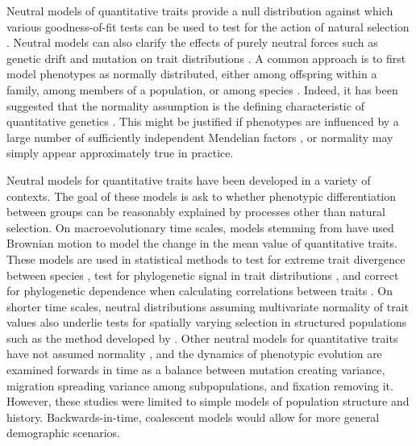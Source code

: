 Neutral models of quantitative traits provide a null distribution against which
various goodness-of-fit tests can be used to test for the action of natural
selection \citep{Lande1976,Leinonen2013}. Neutral models can also clarify the
effects of purely neutral forces such as genetic drift and mutation on trait
distributions \citep{Lynch1986}. A common approach is to first model phenotypes
as normally distributed, either among offspring within a family, among members
of a population, or among species \citep{Turelli2017}. Indeed, it has been
suggested that the normality assumption is the defining characteristic of
quantitative genetics \citep{Rice2004}. This might be justified if phenotypes
are influenced by a large number of sufficiently independent Mendelian
factors \citep{Fisher1918}, or normality may simply appear approximately true in
practice.

Neutral models for quantitative traits have been developed in a variety of
contexts. The goal of these models is ask to whether phenotypic differentiation
between groups can be reasonably explained by processes other than natural
selection. On macroevolutionary time scales, models stemming
from \citet{Lande1976} have used Brownian motion to model the change in the mean
value of quantitative traits. These models are used in statistical methods to
test for extreme trait divergence between species \citep{Turelli1988}, test for
phylogenetic signal in trait distributions \citep{Freckleton2002}, and correct
for phylogenetic dependence when calculating correlations between
traits \citep{Felsenstein1985}. On shorter time scales, neutral distributions
assuming multivariate normality of trait values also underlie tests for
spatially varying selection in structured populations such as the method
developed by \citet{Ovaskainen2011}. Other neutral models for quantitative
traits have not assumed normality \citep{Chakraborty1982,Lynch1986,Lande1992},
and the dynamics of phenotypic evolution are examined forwards in time as a
balance between mutation creating variance, migration spreading variance among
subpopulations, and fixation removing it. However, these studies were limited to
simple models of population structure and history. Backwards-in-time,
coalescent models would allow for more general demographic scenarios.

